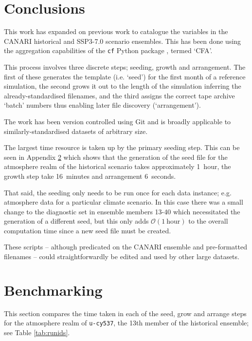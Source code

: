 \documentclass[11pt,a4paper]{article}
\begin{document}
\section{Conclusions}\label{conc}

This work has expanded on previous work to catalogue the variables in the CANARI historical and SSP3-7.0 scenario ensembles. This has been done using the aggregation capabilities of the \texttt{cf} Python package \citep{hassell2017}, termed `CFA'.

This process involves three discrete steps; seeding, growth and arrangement. The first of these generates the template (i.e. `seed') for the first month of a reference simulation, the second grows it out to the length of the simulation inferring the already-standardised filenames, and the third assigns the correct tape archive `batch' numbers thus enabling later file discovery (`arrangement').

The work has been version controlled using Git and is broadly applicable to similarly-standardised datasets of arbitrary size. 

The largest time resource is taken up by the primary seeding step. This can be seen in Appendix \ref{bench} which shows that the generation of the seed file for the atmosphere realm of the historical scenario takes approximately 1~hour, the growth step take 16~minutes and arrangement 6~seconds.

That said, the seeding only needs to be run once for each data instance; e.g. atmosphere data for a particular climate scenario. In this case there was a small change to the diagnostic set in ensemble members 13-40 which necessitated the generation of a different seed, but this only adds $\mathcal{O}(1~\mathrm{hour})$ to the overall computation time since a new seed file must be created. 

These scripts -- although predicated on the CANARI ensemble and pre-formatted filenames -- could straightforwardly be edited and used by other large datasets. 






\appendices

\section{Benchmarking}\label{bench}

This section compares the time taken in each of the seed, grow and arrange steps for the atmosphere realm of \texttt{u-cy537}, the 13th member of the historical ensemble; see Table \ref{tab:runids}.
\end{document}
